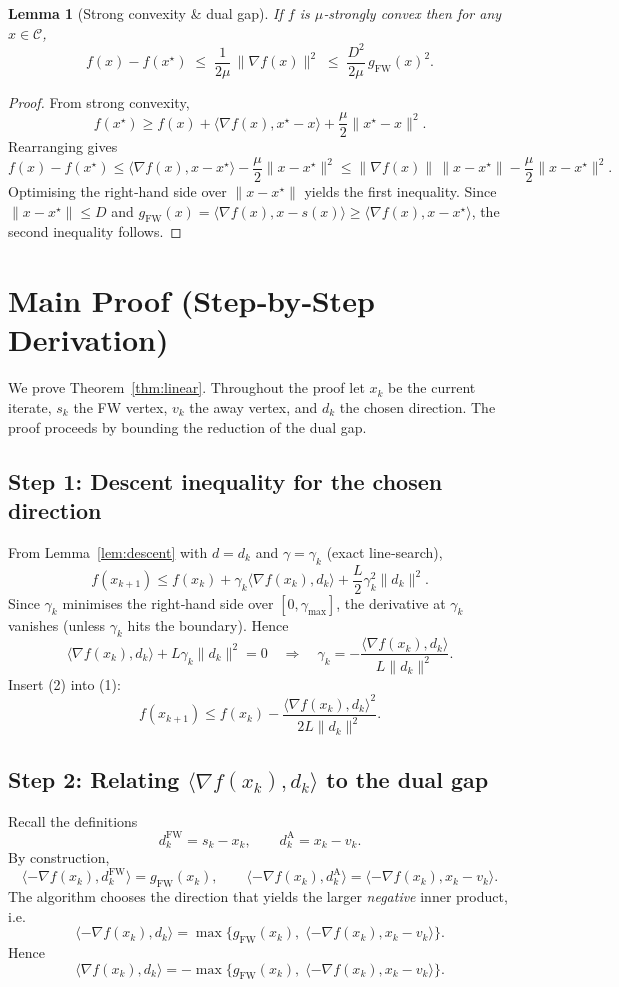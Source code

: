 \documentclass{article}
\newtheorem{lemma}{Lemma}[section]
\begin{document}
\begin{lemma}[Strong convexity \& dual gap]\label{lem:strong_gap}
If $f$ is $\mu$‑strongly convex then for any $x\in\mathcal C$,
\[
f(x)-f(x^\star)\;\le\;\frac{1}{2\mu}\,\| \nabla f(x)\|^2
\;\le\;\frac{D^2}{2\mu}\,g_{\text{FW}}(x)^2 .
\]
\end{lemma}
\begin{proof}
From strong convexity,
\[
f(x^\star)\ge f(x)+\langle\nabla f(x),x^\star-x\rangle+\frac{\mu}{2}\|x^\star-x\|^2 .
\]
Rearranging gives
\[
f(x)-f(x^\star)\le \langle\nabla f(x),x-x^\star\rangle-\frac{\mu}{2}\|x-x^\star\|^2
\le\|\nabla f(x)\|\,\|x-x^\star\|-\frac{\mu}{2}\|x-x^\star\|^2 .
\]
Optimising the right‑hand side over $\|x-x^\star\|$ yields the first inequality.  Since $\|x-x^\star\|\le D$ and $g_{\text{FW}}(x)=\langle\nabla f(x),x-s(x)\rangle\ge\langle\nabla f(x),x-x^\star\rangle$, the second inequality follows. \qedhere
\end{proof}

\section*{Main Proof (Step‑by‑Step Derivation)}
We prove Theorem~\ref{thm:linear}.  Throughout the proof let $x_k$ be the current iterate, $s_k$ the FW vertex, $v_k$ the away vertex, and $d_k$ the chosen direction.  The proof proceeds by bounding the reduction of the dual gap.

\subsection*{Step 1: Descent inequality for the chosen direction}
From Lemma~\ref{lem:descent} with $d=d_k$ and $\gamma=\gamma_k$ (exact line‑search),
\[
f(x_{k+1})\le f(x_k)+\gamma_k\langle\nabla f(x_k),d_k\rangle
               +\frac{L}{2}\gamma_k^2\|d_k\|^2 .\tag{1}
\]
Since $\gamma_k$ minimises the right‑hand side over $[0,\gamma_{\max}]$, the derivative at $\gamma_k$ vanishes (unless $\gamma_k$ hits the boundary).  Hence
\[
\langle\nabla f(x_k),d_k\rangle+\!L\gamma_k\|d_k\|^2=0
\quad\Longrightarrow\quad
\gamma_k=-\frac{\langle\nabla f(x_k),d_k\rangle}{L\|d_k\|^2}. \tag{2}
\]
Insert (2) into (1):
\[
f(x_{k+1})\le f(x_k)-\frac{\langle\nabla f(x_k),d_k\rangle^2}{2L\|d_k\|^2}. \tag{3}
\]

\subsection*{Step 2: Relating $\langle\nabla f(x_k),d_k\rangle$ to the dual gap}
Recall the definitions
\[
d_k^{\text{FW}}=s_k-x_k,\qquad d_k^{\text{A}}=x_k-v_k .
\]
By construction,
\[
\langle-\nabla f(x_k),d_k^{\text{FW}}\rangle
   =g_{\text{FW}}(x_k),\qquad
\langle-\nabla f(x_k),d_k^{\text{A}}\rangle
   =\langle-\nabla f(x_k),x_k-v_k\rangle .
\]
The algorithm chooses the direction that yields the larger \emph{negative} inner product, i.e.
\[
\langle-\nabla f(x_k),d_k\rangle
   =\max\bigl\{g_{\text{FW}}(x_k),\;\langle-\nabla f(x_k),x_k-v_k\rangle\bigr\}. \tag{4}
\]
Hence
\[
\langle\nabla f(x_k),d_k\rangle = -\max\bigl\{g_{\text{FW}}(x_k),\;
\langle-\nabla f(x_k),x_k-v_k\rangle\bigr\}. \tag{5}
\]
\end{document}

